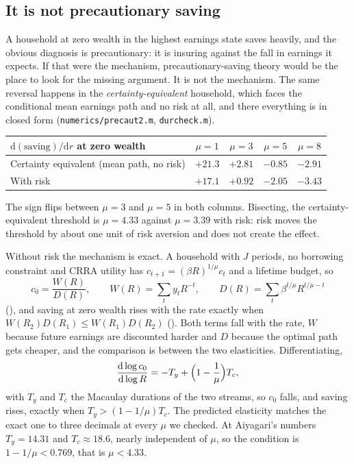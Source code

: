 \subsection{It is not precautionary saving}

A household at zero wealth in the highest earnings state saves heavily, and the obvious diagnosis
is precautionary: it is insuring against the fall in earnings it expects. If that were the
mechanism, precautionary-saving theory would be the place to look for the missing argument. It is
not the mechanism. The same reversal happens in the \emph{certainty-equivalent} household, which
faces the conditional mean earnings path and no risk at all, and there everything is in closed
form (\texttt{numerics/precaut2.m}, \texttt{durcheck.m}).

\begingroup\small
\begin{center}
\begin{tabular}{@{}lcccc@{}}
\toprule
$\mathrm{d}(\text{saving})/\mathrm{d}r$ at zero wealth & $\mu=1$ & $\mu=3$ & $\mu=5$ & $\mu=8$\\
\midrule
Certainty equivalent (mean path, no risk) & $+21.3$ & $+2.81$ & $-0.85$ & $-2.91$\\
With risk & $+17.1$ & $+0.92$ & $-2.05$ & $-3.43$\\
\bottomrule
\end{tabular}
\end{center}
\endgroup

The sign flips between $\mu=3$ and $\mu=5$ in both columns. Bisecting, the certainty-equivalent
threshold is $\mu=4.33$ against $\mu=3.39$ with risk: risk moves the threshold by about one unit
of risk aversion and does not create the effect.

Without risk the mechanism is exact. A household with $J$ periods, no borrowing constraint and
CRRA utility has $c_{t+1}=(\beta R)^{1/\mu}c_t$ and a lifetime budget, so
\[
  c_0=\frac{W(R)}{D(R)},\qquad
  W(R)=\sum_t y_tR^{-t},\qquad
  D(R)=\sum_t\beta^{t/\mu}R^{t/\mu-t}
\]
(), and saving at zero wealth rises with the rate exactly when
$W(R_2)D(R_1)\le W(R_1)D(R_2)$ (). Both terms fall with the rate,
$W$ because future earnings are discounted harder and $D$ because the optimal path gets cheaper,
and the comparison is between the two elasticities. Differentiating,
\[
  \frac{\mathrm{d}\log c_0}{\mathrm{d}\log R}=-T_y+\Bigl(1-\frac1\mu\Bigr)T_c ,
\]
with $T_y$ and $T_c$ the Macaulay durations of the two streams, so $c_0$ falls, and saving rises,
exactly when $T_y>(1-1/\mu)T_c$. The predicted elasticity matches the exact one to three decimals
at every $\mu$ we checked. At Aiyagari's numbers $T_y=14.31$ and $T_c\approx18.6$, nearly
independent of $\mu$, so the condition is $1-1/\mu<0.769$, that is $\mu<4.33$.

